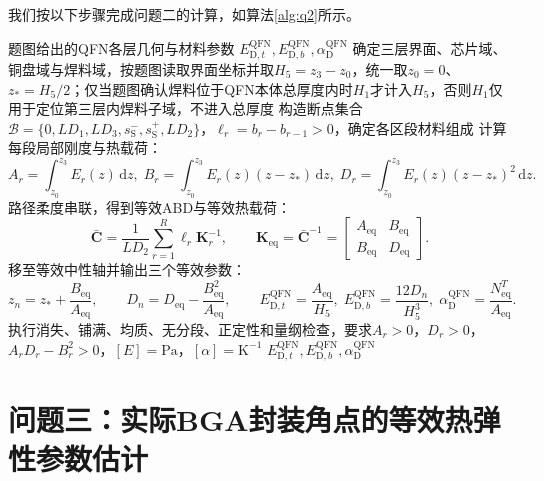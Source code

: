 \documentclass[draft,12pt,a4paper]{ctexart}
\theoremstyle{definition}
\newcommand{\diff}{\mathrm{d}}
\begin{document}
我们按以下步骤完成问题二的计算，如算法\ref{alg:q2}所示。

\begin{algorithm}[H]
\caption{问题二等效参数计算流程}\label{alg:q2}
\begin{algorithmic}[1]
\Require 题图给出的QFN各层几何与材料参数
\Ensure $E_{\mathrm D,t}^{\mathrm{QFN}},E_{\mathrm D,b}^{\mathrm{QFN}},\alpha_{\mathrm D}^{\mathrm{QFN}}$
\State 确定三层界面、芯片域、铜盘域与焊料域，按题图读取界面坐标并取$H_5=z_3-z_0$，统一取$z_0=0$、$z_*=H_5/2$；仅当题图确认焊料位于QFN本体总厚度内时$H_1$才计入$H_5$，否则$H_1$仅用于定位第三层内焊料子域，不进入总厚度
\State 构造断点集合$\mathcal B=\{0,LD_1,LD_3,s_{\mathrm S}^-,s_{\mathrm S}^+,LD_2\}$，$\ell_r=b_r-b_{r-1}>0$，确定各区段材料组成
\State 计算每段局部刚度与热载荷：
\[
A_r=\int_{z_0}^{z_3}E_r(z)\,\diff z,\;
B_r=\int_{z_0}^{z_3}E_r(z)(z-z_*)\,\diff z,\;
D_r=\int_{z_0}^{z_3}E_r(z)(z-z_*)^2\,\diff z.
\]
\State 路径柔度串联，得到等效ABD与等效热载荷：
\[
\bar{\mathbf C}=\frac{1}{LD_2}\sum_{r=1}^{R}\ell_r\mathbf K_r^{-1},\qquad
\mathbf K_{\mathrm{eq}}=\bar{\mathbf C}^{-1}
=\begin{bmatrix}A_{\mathrm{eq}}&B_{\mathrm{eq}}\\B_{\mathrm{eq}}&D_{\mathrm{eq}}\end{bmatrix}.
\]
\State 移至等效中性轴并输出三个等效参数：
\[
z_n=z_*+\frac{B_{\mathrm{eq}}}{A_{\mathrm{eq}}},\qquad
D_n=D_{\mathrm{eq}}-\frac{B_{\mathrm{eq}}^2}{A_{\mathrm{eq}}},\qquad
E_{\mathrm D,t}^{\mathrm{QFN}}=\frac{A_{\mathrm{eq}}}{H_5},\;
E_{\mathrm D,b}^{\mathrm{QFN}}=\frac{12D_n}{H_5^3},\;
\alpha_{\mathrm D}^{\mathrm{QFN}}=\frac{N_{\mathrm{eq}}^T}{A_{\mathrm{eq}}}.
\]
\State 执行消失、铺满、均质、无分段、正定性和量纲检查，要求$A_r>0$，$D_r>0$，$A_rD_r-B_r^2>0$，$[E]=\mathrm{Pa}$，$[\alpha]=\mathrm{K}^{-1}$
\State \Return $E_{\mathrm D,t}^{\mathrm{QFN}},E_{\mathrm D,b}^{\mathrm{QFN}},\alpha_{\mathrm D}^{\mathrm{QFN}}$
\end{algorithmic}
\end{algorithm}



\section{问题三：实际BGA封装角点的\textbf{等效热弹性参数}估计}
\end{document}
